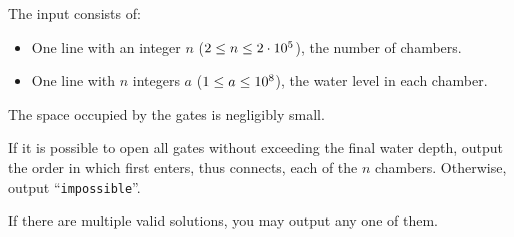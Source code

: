 \begin{Input}
    The input consists of:
    \begin{itemize}
        \item One line with an integer $n$ ($2 \le n \le 2\cdot 10^5$), the number of chambers.
        \item One line with $n$ integers $a$ ($1 \le a \le 10^8$), the water level in each chamber.
    \end{itemize}
    The space occupied by the gates is negligibly small.
\end{Input}

\begin{Output}
    If it is possible to open all gates without exceeding the final water depth,
    output the order in which \hero{} first enters, thus connects, each of the $n$ chambers.
    Otherwise, output ``\texttt{impossible}''.

    If there are multiple valid solutions, you may output any one of them.
\end{Output}
